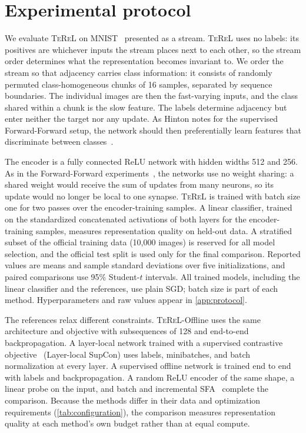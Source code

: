 \documentclass[11pt]{article}
\newcommand{\TeReL}{\textsc{TeReL}}
\newcommand{\TeReLOffline}{\TeReL{}-Offline}
\begin{document}
\section{Experimental protocol}
\label{sec:experiments}

We evaluate \TeReL{} on MNIST~\cite{lecun1998} presented as a stream. \TeReL{}
uses no labels: its positives are whichever inputs the stream places next to
each other, so the stream order determines what the representation becomes
invariant to. We order the stream so that adjacency carries class
information: it consists of randomly permuted class-homogeneous chunks of 16
samples, separated by sequence boundaries. The individual images are then the
fast-varying inputs, and the class shared within a chunk is the slow feature.
The labels determine adjacency but enter neither the target nor any update. As
Hinton notes for the supervised Forward-Forward setup, the network should then
preferentially learn features that discriminate between
classes~\cite{hinton2022}.

The encoder is a fully connected ReLU network with hidden widths 512 and 256.
As in the Forward-Forward experiments~\cite{hinton2022}, the networks use no
weight sharing: a shared weight would receive the sum of updates from many
neurons, so its update would no longer be local to one synapse. \TeReL{} is
trained with batch size one for two passes over the encoder-training samples.
A linear classifier, trained on the standardized concatenated activations of
both layers for the encoder-training samples, measures representation quality
on held-out data. A stratified subset of the official training data (10{,}000
images) is reserved for all model selection, and the official test split is
used only for the final comparison. Reported values are means and sample
standard deviations over five initializations, and paired comparisons use 95\%
Student-$t$ intervals. All trained models, including the linear classifier and
the references, use plain SGD; batch size is part of each method.
Hyperparameters and raw values appear in \cref{app:protocol}.

The references relax different constraints. \TeReLOffline{} uses the same
architecture and objective with subsequences of 128 and end-to-end
backpropagation. A layer-local network trained with a supervised contrastive
objective~\cite{khosla2020} (Layer-local SupCon) uses labels, minibatches, and
batch normalization at every layer. A supervised offline network is trained
end to end with labels and backpropagation. A random ReLU encoder of the same
shape, a linear probe on the input, and batch and incremental
SFA~\cite{wiskott2002,kompella2012} complete the comparison. Because the
methods differ in their data and optimization requirements
(\cref{tab:configuration}), the comparison measures representation quality at
each method's own budget rather than at equal compute.
\end{document}
